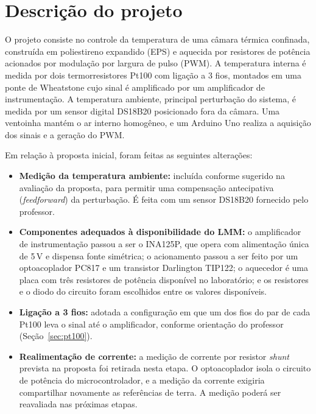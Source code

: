 
\section{Descrição do projeto}

O projeto consiste no controle da temperatura de uma câmara térmica confinada, construída em poliestireno expandido (EPS) e aquecida por resistores de potência acionados por modulação por largura de pulso (PWM). A temperatura interna é medida por dois termorresistores Pt100 com ligação a 3 fios, montados em uma ponte de Wheatstone cujo sinal é amplificado por um amplificador de instrumentação. A temperatura ambiente, principal perturbação do sistema, é medida por um sensor digital DS18B20 posicionado fora da câmara. Uma ventoinha mantém o ar interno homogêneo, e um Arduino Uno realiza a aquisição dos sinais e a geração do PWM.

Em relação à proposta inicial, foram feitas as seguintes alterações:

\begin{itemize}
  \item \textbf{Medição da temperatura ambiente:} incluída conforme sugerido na avaliação da proposta, para permitir uma compensação antecipativa (\textit{feedforward}) da perturbação. É feita com um sensor DS18B20 fornecido pelo professor.
  \item \textbf{Componentes adequados à disponibilidade do LMM:} o amplificador de instrumentação passou a ser o INA125P, que opera com alimentação única de 5\,V e dispensa fonte simétrica; o acionamento passou a ser feito por um optoacoplador PC817 e um transistor Darlington TIP122; o aquecedor é uma placa com três resistores de potência disponível no laboratório; e os resistores e o diodo do circuito foram escolhidos entre os valores disponíveis.
  \item \textbf{Ligação a 3 fios:} adotada a configuração em que um dos fios do par de cada Pt100 leva o sinal até o amplificador, conforme orientação do professor (Seção~\ref{sec:pt100}).
  \item \textbf{Realimentação de corrente:} a medição de corrente por resistor \textit{shunt} prevista na proposta foi retirada nesta etapa. O optoacoplador isola o circuito de potência do microcontrolador, e a medição da corrente exigiria compartilhar novamente as referências de terra. A medição poderá ser reavaliada nas próximas etapas.
\end{itemize}
